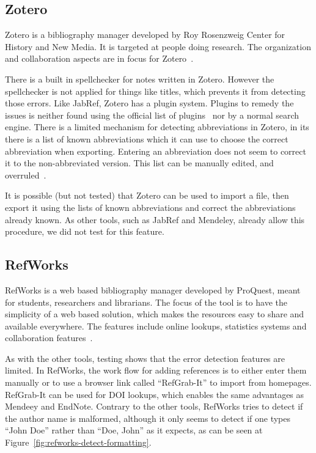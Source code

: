 \subsection{Zotero}

Zotero is a bibliography manager developed by Roy Rosenzweig Center
for History and New Media.  It is targeted at people doing research.
The organization and collaboration aspects are in focus for
Zotero~\cite{zotero_features}.

There is a built in spellchecker for notes written in Zotero.
However the spellchecker is not applied for things like titles, which
prevents it from detecting those errors.  Like JabRef, Zotero has a
plugin system.  Plugins to remedy the {\bibtex} issues is neither
found using the official list of plugins~\cite{zotero_plugins} nor by
a normal search engine. There is a limited mechanism for detecting
abbreviations in Zotero, in its  there is a list of known
abbreviations which it can use to choose the correct abbreviation when
exporting.  Entering an abbreviation does not seem to correct it to
the non-abbreviated version.  This list can be manually edited, and
overruled~\cite{zotero_abbreviations}.

It is possible (but not tested) that Zotero can be used to import a
{\bibtex} file, then export it using the lists of known abbreviations
and correct the abbreviations already known.  As other tools, such as
JabRef and Mendeley, already allow this procedure, we did not test for
this feature.


\subsection{RefWorks}
RefWorks is a web based bibliography manager developed by ProQuest,
meant for students, researchers and librarians.  The focus of the tool
is to have the simplicity of a web based solution, which makes the
resources easy to share and available everywhere.  The features
include online lookups, statistics systems and collaboration
features~\cite{refworks_features}.

As with the other tools, testing shows that the error detection
features are limited.  In RefWorks, the work flow for adding
references is to either enter them manually or to use a browser link
called ``RefGrab-It'' to import from homepages.  RefGrab-It can be
used for DOI lookups, which enables the same advantages as Mendeey and
EndNote.  Contrary to the other tools, RefWorks tries to detect if the
author name is malformed, although it only seems to detect if one
types ``John Doe'' rather than ``Doe, John'' as it expects, as can be
seen at Figure~\ref{fig:refworks-detect-formatting}.

